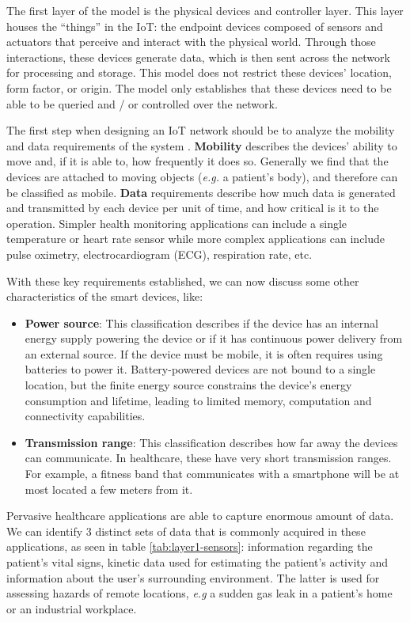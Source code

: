 The first layer of the model is the physical devices and controller layer. This layer houses the ``things'' in the \acl{IoT}: the endpoint devices composed of sensors and actuators that perceive and interact with the physical world. Through those interactions, these devices generate data, which is then sent across the network for processing and storage. This model does not restrict these devices' location, form factor, or origin. The model only establishes that these devices need to be able to be queried and / or controlled over the network.

The first step when designing an IoT network should be to analyze the mobility and data requirements of the system \cite{10.5555/3161403}. \textbf{Mobility} describes the devices' ability to move and, if it is able to, how frequently it does so. Generally we find that the devices are attached to moving objects (\textit{e.g.} a patient's body), and therefore can be classified as mobile. \textbf{Data} requirements describe how much data is generated and transmitted by each device per unit of time, and how critical is it to the operation. Simpler health monitoring applications can include a single temperature or heart rate sensor while more complex applications can include pulse oximetry, electrocardiogram (\acs{ECG}), respiration rate, etc. 

With these key requirements established, we can now discuss some other characteristics of the smart devices, like:

\begin{itemize}
    \item \textbf{Power source}: This classification describes if the device has an internal energy supply powering the device or if it has continuous power delivery from an external source. If the device must be mobile, it is often requires using batteries to power it. Battery-powered devices are not bound to a single location, but the finite energy source constrains the device's energy consumption and lifetime, leading to limited memory, computation and connectivity capabilities. 
    \item \textbf{Transmission range}: This classification describes how far away the devices can communicate. In healthcare, these have very short transmission ranges. For example, a fitness band that communicates with a smartphone will be at most located a few meters from it.
\end{itemize}

Pervasive healthcare applications are able to capture enormous amount of data. We can identify 3 distinct sets of data that is commonly acquired in these applications, as seen in table \ref{tab:layer1-sensors}: information regarding the patient's vital signs, kinetic data used for estimating the patient's activity and information about the user's surrounding environment. The latter is used for assessing hazards of remote locations, \textit{e.g} a sudden gas leak in a patient's home or an industrial workplace.

